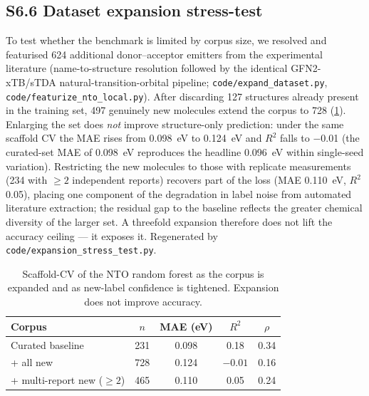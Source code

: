 \documentclass[twoside,twocolumn,9pt]{extarticle}
\begin{document}
\subsection*{S6.6 Dataset expansion stress-test}
To test whether the benchmark is limited by corpus size, we resolved and featurised
\num{624} additional donor--acceptor emitters from the experimental literature
(name-to-structure resolution followed by the identical GFN2-xTB/sTDA natural-transition-orbital
pipeline; \texttt{code/expand\_dataset.py}, \texttt{code/featurize\_nto\_local.py}). After
discarding \num{127} structures already present in the training set, \num{497} genuinely new
molecules extend the corpus to \num{728} (\cref{tab:expansion}). Enlarging the set does
\emph{not} improve structure-only prediction: under the same scaffold CV the MAE rises from
\qty{0.098}{\electronvolt} to \qty{0.124}{\electronvolt} and $R^2$ falls to \num{-0.01} (the
curated-set MAE of \qty{0.098}{\electronvolt} reproduces the headline \qty{0.096}{\electronvolt}
within single-seed variation). Restricting the new molecules to those with replicate
measurements (\num{234} with $\ge\num{2}$ independent reports) recovers part of the loss
(MAE \qty{0.110}{\electronvolt}, $R^2$ \num{0.05}), placing one component of the degradation in
label noise from automated literature extraction; the residual gap to the baseline reflects the
greater chemical diversity of the larger set. A threefold expansion therefore does not lift the
accuracy ceiling --- it exposes it. Regenerated by \texttt{code/expansion\_stress\_test.py}.

\begin{table}[htbp]
  \centering
  \caption{Scaffold-CV of the NTO random forest as the corpus is expanded and as
    new-label confidence is tightened. Expansion does not improve accuracy.}
  \label{tab:expansion}
  \footnotesize
  \begin{tabular}{lcccc}
    \toprule
    Corpus & $n$ & MAE (eV) & $R^2$ & $\rho$ \\
    \midrule
    Curated baseline            & 231 & 0.098 & \phantom{$-$}0.18 & 0.34 \\
    + all new                   & 728 & 0.124 & $-0.01$           & 0.16 \\
    + multi-report new ($\ge 2$) & 465 & 0.110 & \phantom{$-$}0.05 & 0.24 \\
    \bottomrule
  \end{tabular}
\end{table}

\end{document}
